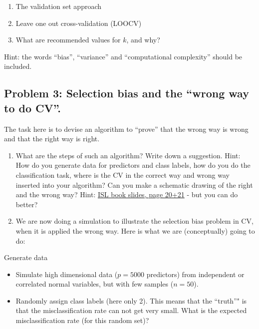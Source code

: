 \documentclass[]{article}
\providecommand{\tightlist}{%
  \setlength{\itemsep}{0pt}\setlength{\parskip}{0pt}}
\begin{document}
\begin{enumerate}
\def\labelenumi{\alph{enumi})}
\tightlist
\item
  The validation set approach
\item
  Leave one out cross-validation (LOOCV)
\item
  What are recommended values for \(k\), and why?
\end{enumerate}

Hint: the words ``bias'', ``variance'' and ``computational complexity''
should be included.

\subsection{\texorpdfstring{Problem 3: Selection bias and the ``wrong
way to do
CV''.}{Problem 3: Selection bias and the wrong way to do CV.}}\label{problem-3-selection-bias-and-the-wrong-way-to-do-cv.}

The task here is to devise an algorithm to ``prove'' that the wrong way
is wrong and that the right way is right.

\begin{enumerate}
\def\labelenumi{\alph{enumi})}
\item
  What are the steps of such an algorithm? Write down a suggestion.
  Hint: How do you generate data for predictors and class labels, how do
  you do the classification task, where is the CV in the correct way and
  wrong way inserted into your algorithm? Can you make a schematic
  drawing of the right and the wrong way? Hint:
  \href{https://lagunita.stanford.edu/c4x/HumanitiesScience/StatLearning/asset/cv_boot.pdf}{ISL
  book slides, page 20+21} - but you can do better?
\item
  We are now doing a simulation to illustrate the selection bias problem
  in CV, when it is applied the wrong way. Here is what we are
  (conceptually) going to do:
\end{enumerate}

Generate data

\begin{itemize}
\item
  Simulate high dimensional data (\(p=5000\) predictors) from
  independent or correlated normal variables, but with few samples
  (\(n=50\)).
\item
  Randomly assign class labels (here only 2). This means that the
  ``truth''" is that the misclassification rate can not get very small.
  What is the expected misclassification rate (for this random set)?
\end{itemize}
\end{document}
